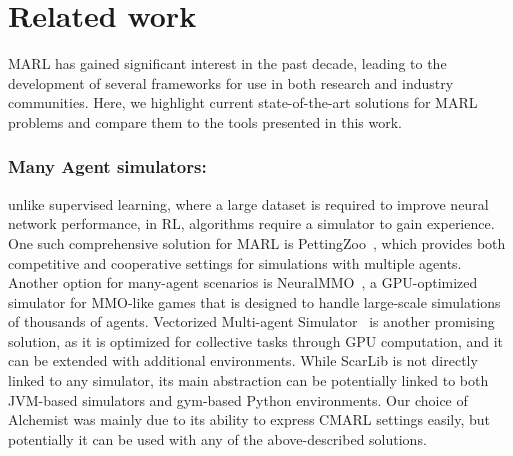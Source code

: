 \section{Related work}\label{sec:related}
MARL has gained significant interest in the past decade, 
 leading to the development of several frameworks 
 for use in both research and industry communities. 
Here, we highlight current state-of-the-art solutions 
 for MARL problems and compare 
 them to the tools presented in this work.
\subsubsection{Many Agent simulators:}   
unlike supervised learning, 
 where a large dataset is required to improve neural network performance, 
 in RL, algorithms require a simulator to gain experience. 
One such comprehensive solution for MARL is PettingZoo~\cite{NEURIPS2021_7ed2d345}, 
 which provides both competitive and cooperative settings 
 for simulations with multiple agents. 
%
Another option for many-agent scenarios is NeuralMMO~\cite{https://doi.org/10.48550/arxiv.1903.00784}, 
 a GPU-optimized simulator for MMO-like games 
 that is designed to handle large-scale simulations of thousands of agents.
% 
Vectorized Multi-agent Simulator~\cite{bettini2022vmas} is another promising solution, 
 as it is optimized for collective tasks through GPU computation, 
 and it can be extended with additional environments.
%
While ScarLib is not directly linked to any simulator, 
 its main abstraction can be potentially linked 
 to both JVM-based simulators and gym-based Python environments. 
 Our choice of Alchemist was mainly due to its ability to express CMARL settings easily, but potentially it can be used with any of the above-described solutions.
